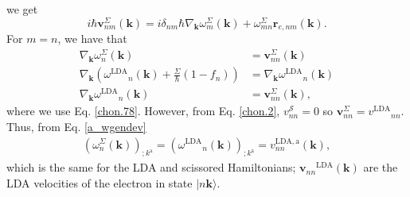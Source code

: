 we get
\begin{equation}\label{a_hrt2}
i\hbar\mathbf{v}^{\Sigma}_{nm}(\mathbf{k})
= i\delta_{nm}\hbar\nabla_{\mathbf{k}}\omega^{\Sigma}_{m}(\mathbf{k})
  + \omega^{\Sigma}_{mn}\mathbf{r}_{e,nm}(\mathbf{k}).
\end{equation}
For $m = n$, we have that
\begin{align}\label{a_gradw}
\nabla_{\mathbf{k}}\omega^{\Sigma}_{n}(\mathbf{k})
    &= \mathbf{v}^{\Sigma}_{nn}(\mathbf{k})\nonumber\\
\nabla_{\mathbf{k}}(\omega{^\mathrm{LDA}}_{n}(\mathbf{k})
    + \frac{\Sigma}{\hbar}(1-f_{n}))
&= \nabla_{\mathbf{k}}\omega{^\mathrm{LDA}}_{n}(\mathbf{k})\nonumber\\
\nabla_{\mathbf{k}}\omega{^\mathrm{LDA}}_{n}(\mathbf{k})
    &= \mathbf{v}^{\Sigma}_{nn}(\mathbf{k}),
\end{align}
where we use Eq. \eqref{chon.78}. However, from Eq. \eqref{chon.2},
$v^{\mathcal{S}}_{nn} = 0$ so $\mathbf{v}^{\Sigma}_{nn}=v{^\mathrm{LDA}}_{nn}$.
Thus, from Eq. \eqref{a_wgendev}
\begin{align}\label{a_gradw2}
(\omega^{\Sigma}_{n}(\mathbf{k}))_{;k^{\mathrm{a}}}
= (\omega{^\mathrm{LDA}}_{n}(\mathbf{k}))_{;k^{\mathrm{a}}}
= v^{\mathrm{LDA},\mathrm{a}}_{nn}(\mathbf{k}),
\end{align}
which is the same for the LDA and scissored Hamiltonians;
$\mathbf{v}_{nn}{^\mathrm{LDA}}(\mathbf{k})$ are the LDA velocities of the
electron in state $\vert n\mathbf{k}\rangle$.


\stopcontents[chapters]
